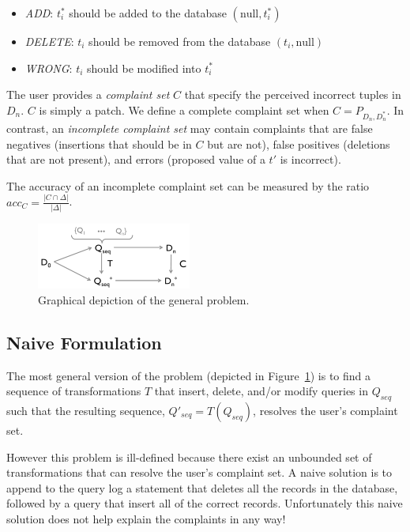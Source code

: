 \begin{itemize}
\item {\it ADD}: $t^*_i$ should be added to the database $(\textrm{null}, t^*_i)$
\item {\it DELETE}: $t_i$ should be removed from the database $(t_i, \textrm{null})$
\item {\it WRONG}: $t_i$ should be modified into $t^*_i$
\end{itemize}


The user provides a {\it complaint set} $C$ that specify the perceived incorrect tuples in $D_n$.
$C$ is simply a patch.
We define a complete complaint set when $C = P_{D_n, D^*_n}$.
In contrast, an {\it incomplete complaint set}  may contain complaints that are false negatives (insertions that should be in $C$ but are not),
false positives (deletions that are not present), and errors (proposed value of a $t'$ is incorrect).

The accuracy of an incomplete complaint set can be measured by the ratio $acc_C = \frac{|C \cap \Delta|}{|\Delta|}$.



\begin{figure}[t]
\centering
\includegraphics[width = 2in]{figures/probtransform}
\caption{Graphical depiction of the general \sys problem.}
\label{f:probtransform} 
\end{figure}



\subsection{Naive Formulation}

The most general version of the problem
(depicted in Figure~\ref{f:probtransform}) is to find a sequence of
transformations $T$ that insert, delete, and/or modify queries in $Q_{seq}$ 
such that the resulting sequence, $Q'_{seq} = T(Q_{seq})$, resolves the user's complaint set. 

However this problem is ill-defined because there exist an unbounded set of transformations that
can resolve the user's complaint set.  A naive solution is to append to the query log a statement
that deletes all the records in the database, followed by a query that insert all of the correct records.
Unfortunately this naive solution does not help explain the complaints in any way!

